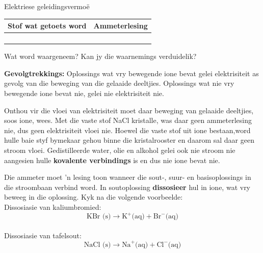 \begin{g_experiment}{Elektriese geleidingsvermo\"{e}}
\begin{table}[H]
\begin{center}
    \noindent
      \begin{tabular}{|l|l|}\hline
        Stof wat getoets word &
        Ammeterlesing \\ \hline
         &
       \\ \hline
         &
       \\ \hline
         &
       \\ \hline
         &
    \\ \hline
    \end{tabular}
      \end{center}
\end{table}
    \par
  \par 
        \label{m38720*id339669}Wat word waargeneem?  Kan jy die waarnemings verduidelik?\par 
        \label{m38720*id339864}\noindent{}\textbf{Gevolgtrekkings:}
          \newline
Oplossings wat vry bewegende ione bevat gelei elektrisiteit as gevolg van die beweging van die gelaaide deeltjies. Oplossings wat nie vry bewegende ione bevat nie, gelei nie elektrisiteit nie.
\end{g_experiment}
Onthou vir die vloei van elektrisiteit moet daar beweging van gelaaide deeltjies, soos ione, wees. Met die vaste stof NaCl kristalle, was daar geen ammeterlesing nie, dus geen elektrisiteit vloei nie. Hoewel die vaste stof uit ione bestaan,word hulle baie styf bymekaar gehou binne die kristalrooster en daarom sal daar geen stroom vloei. Gedistilleerde water, olie en alkohol gelei ook nie stroom nie aangesien hulle \textbf{kovalente verbindings} is en dus nie ione bevat nie.\par 
Die ammeter moet   'n lesing toon wanneer die sout-, suur- en basisoplossings in die stroombaan verbind word.  In soutoplossing \textbf{dissosieer} hul in ione, wat vry beweeg in die oplossing. Kyk na die volgende voorbeelde:\\
Dissosiasie van kaliumbromied:\\
        \label{m38720*id339701}\nopagebreak\noindent        
    \begin{equation*}
    \text{KBr (s)} \to {\text{K}}^{+} \text{(aq)} + {\text{Br}}^{-} \text{(aq)}
      \end{equation*} \\
Dissosiasie van tafelsout:\\
        \label{m38720*id339737}\nopagebreak\noindent          
    \begin{equation*}
    \text{NaCl (s)}\to {\text{Na}}^{+} \text{(aq)} + {\text{Cl}}^{-} \text{(aq)}
      \end{equation*}\\
